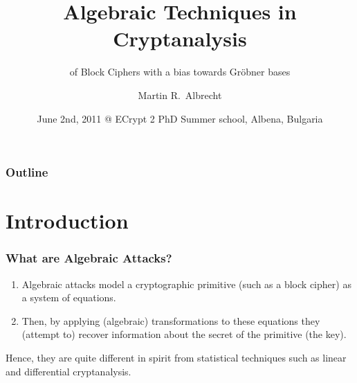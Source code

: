 \documentclass[9pt]{beamer}
\title{Algebraic Techniques in Cryptanalysis}
\subtitle{of Block Ciphers with a bias towards \texorpdfstring{Gröbner}{Groebner} bases}
\author{Martin R.\ Albrecht}
\institute{Team SALSA, UPMC, Paris 6, \dots}
\date{June 2nd, 2011 @ ECrypt 2 PhD Summer school, Albena, Bulgaria}
\begin{document}
\begin{frame}

\titlepage
\end{frame}

\begin{frame}
\frametitle{Outline}
\tableofcontents
\end{frame}

\section{Introduction}

\begin{frame}
\frametitle{What are Algebraic Attacks?} 

\begin{enumerate}
 \item Algebraic attacks model a cryptographic primitive (such as a block cipher) as a system of equations.
 \item Then, by applying (algebraic) transformations to these equations they (attempt to) recover information about the secret of the primitive (the key).
\end{enumerate}

\begin{block}{}
Hence, they are quite different in spirit from statistical techniques such as linear and differential cryptanalysis.
\end{block}

\end{frame}
\end{document}
